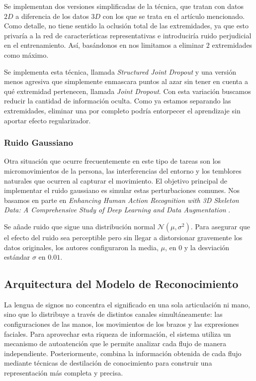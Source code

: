 Se implementan dos versiones simplificadas de la técnica, que tratan con datos $2D$ a diferencia de los datos $3D$ con los que se trata en el artículo mencionado.
Como detalle, no tiene sentido la oclusión total de las extremidades, ya que esto privaría a la red de características representativas e introduciría ruido perjudicial en el entrenamiento.
Así, basándonos en \cite{JDrop} nos limitamos a eliminar $2$ extremidades como máximo.

Se implementa esta técnica, llamada \textit{Structured Joint Dropout} y una versión menos agresiva que simplemente enmascara puntos al azar sin tener en cuenta a qué extremidad pertenecen, llamada \textit{Joint Dropout}.
Con esta variación buscamos reducir la cantidad de información oculta.
Como ya estamos separando las extremidades, eliminar una por completo podría entorpecer el aprendizaje sin aportar efecto regularizador.

\subsubsection*{Ruido Gaussiano}
Otra situación que ocurre frecuentemente en este tipo de tareas son los micromovimientos de la persona, las interferencias del entorno y los temblores naturales que ocurren al capturar el movimiento.
El objetivo principal de implementar el ruido gaussiano es simular estas perturbaciones comunes.
Nos basamos en parte en \textit{Enhancing Human Action Recognition with 3D Skeleton Data: A Comprehensive Study of Deep Learning and Data Augmentation} \cite{noise}.

Se añade ruido que sigue una distribución normal $\mathcal{N}(\mu,\sigma^2)$.
Para asegurar que el efecto del ruido sea perceptible pero sin llegar a distorsionar gravemente los datos originales, los autores configuraron la media, $\mu$, en $0$ y la desviación estándar $\sigma$ en $0.01$.

\subsection{Arquitectura del Modelo de Reconocimiento}\label{sec:MSKA_SLR}
La lengua de signos no concentra el significado en una sola articulación ni mano, sino que lo distribuye a través de distintos canales simultáneamente: las configuraciones de las manos, los movimientos de los brazos y las expresiones faciales.
Para aprovechar esta riqueza de información, el sistema utiliza un mecanismo de autoatención que le permite analizar cada flujo de manera independiente.
Posteriormente, combina la información obtenida de cada flujo mediante técnicas de destilación de conocimiento para construir una representación más completa y precisa.

